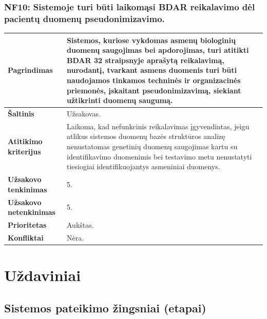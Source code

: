 \documentclass[12pt]{article}
\begin{document}
\subsubsection*{NF10: Sistemoje turi būti laikomąsi BDAR reikalavimo dėl
pacientų duomenų pseudonimizavimo.}
\label{sec:NF10}
\begin{table}[htb!]
    \captionsetup{justification=centering}
    \begin{tabular}{|m{4.9cm}|m{11cm}|}
        \hline
        \raggedleft \textbf{\cellcolor{deepchampagne}Pagrindimas} &
        Sistemos, kuriose vykdomas asmenų biologinių duomenų saugojimas bei
        apdorojimas, turi atitikti BDAR 32 straipsnyje aprašytą reikalavimą,
        nurodantį, tvarkant asmens duomenis turi būti naudojamos tinkamos
        techninės ir organizacinės priemonės, įskaitant pseudonimizavimą,
        siekiant užtikrinti duomenų saugumą. \\
        \hline
        \raggedleft \textbf{\cellcolor{deepchampagne}Šaltinis} & Užsakovas. \\
        \hline
        \raggedleft \textbf{\cellcolor{deepchampagne}Atitikimo kriterijus} & 
        Laikoma, kad nefunkcinis reikalavimas įgyvendintas, jeigu atlikus
        sistemos duomenų bazės struktūros analizę nenustatomas genetinių duomenų
        saugojimas kartu su identifikavimo duomenimis bei testavimo metu
        nenustatyti tiesiogiai identifikuojantys asmeniniai duomenys. \\
        \hline
        \raggedleft \textbf{\cellcolor{deepchampagne}Užsakovo tenkinimas} & 5. \\
        \hline
        \raggedleft \textbf{\cellcolor{deepchampagne}Užsakovo netenkinimas} & 5. \\
        \hline
        \raggedleft \textbf{\cellcolor{deepchampagne}Prioritetas} & Aukštas. \\
        \hline
        \raggedleft \textbf{\cellcolor{deepchampagne}Konfliktai} & Nėra. \\
        \hline
    \end{tabular}
\end{table}

\newpage

\newpage

\section{Uždaviniai}
\subsection{Sistemos pateikimo žingsniai (etapai)}
\end{document}
